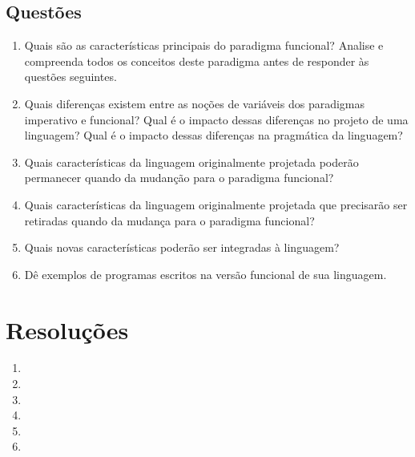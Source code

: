 \documentclass[12pt, a4paper]{article}
\begin{document}
    \subsection{Questões}
    \begin{enumerate}[leftmargin=*]
        \item %
        Quais são as características principais do paradigma funcional? Analise
        e compreenda todos os conceitos deste paradigma antes de responder às
        questões seguintes.

        \item %
        Quais diferenças existem entre as noções de variáveis dos paradigmas
        imperativo e funcional? Qual é o impacto dessas diferenças no projeto
        de uma linguagem? Qual é o impacto dessas diferenças na pragmática da
        linguagem?

        \item %
        Quais características da linguagem originalmente projetada poderão
        permanecer quando da mudanção para o paradigma funcional?

        \item %
        Quais características da linguagem originalmente projetada que
        precisarão ser retiradas quando da mudança para o paradigma funcional?

        \item %
        Quais novas características poderão ser integradas à linguagem?

        \item %
        Dê exemplos de programas escritos na versão funcional de sua linguagem.

    \end{enumerate}

\section{Resoluções}
    \begin{enumerate}[leftmargin=*]
        \item
        

        \item
        

        \item
        

        \item
        

        \item
        

        \item
        
    \end{enumerate}
\end{document}
